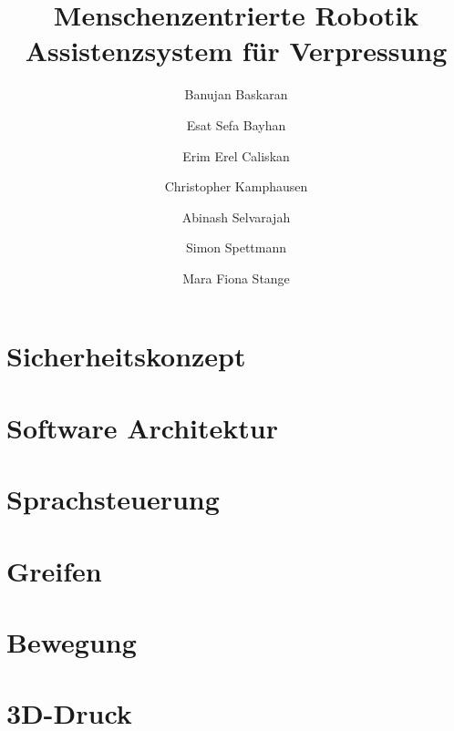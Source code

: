 \documentclass{article}
\title{
    Menschenzentrierte Robotik \\
    Assistenzsystem für Verpressung}
\author{
    Banujan Baskaran \and
    Esat Sefa Bayhan \and
    Erim Erel Caliskan \and
    Christopher Kamphausen \and
    Abinash Selvarajah \and
    Simon Spettmann \and
    Mara Fiona Stange 
}
\begin{document}
\maketitle
\tableofcontents

\section{Sicherheitskonzept}


\section{Software Architektur}


\section{Sprachsteuerung}


\section{Greifen}


\section{Bewegung}


\section{3D-Druck}

\end{document}
